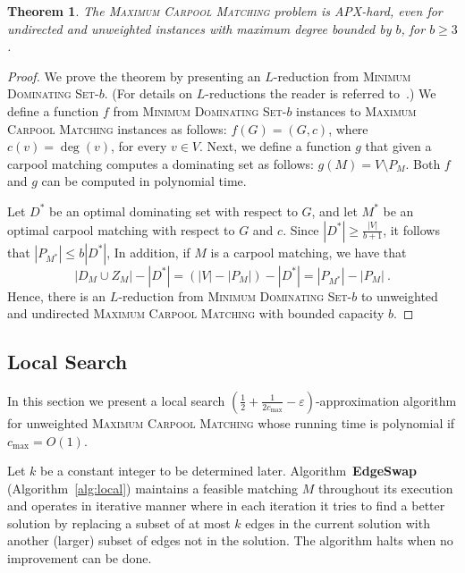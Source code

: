 \documentclass[11pt]{article}
\newtheorem{theorem}{Theorem}
\newcommand{\abs}[1]{\left| #1 \right|}
\newcommand{\half}{\frac{1}{2}}
\newcommand{\inv}[1]{\frac{1}{#1}}
\newcommand{\carpool}{\textsc{Maximum Carpool Matching}\xspace}
\newcommand{\eps}{\varepsilon}
\begin{document}
\begin{theorem}
The \carpool problem is APX-hard, even for undirected and unweighted
instances with maximum degree bounded by $b$, for $b \geq 3$.
\end{theorem}
\begin{proof}
We prove the theorem by presenting an $L$-reduction from
\textsc{Minimum Dominating Set-$b$}.
(For details on $L$-reductions the reader is referred to~\cite{PapYan88}.)
%
We define a function $f$ from \textsc{Minimum Dominating Set-$b$}
instances to \carpool instances as follows: $f(G) = (G,c)$, where
$c(v) = \deg(v)$, for every $v \in V$.  Next, we define a function $g$
that given a carpool matching computes a dominating set as follows:
$g(M) = V \setminus P_{M}$.  Both $f$ and $g$ can be computed in
polynomial time.

Let $D^*$ be an optimal dominating set with respect to $G$, and let
$M^*$ be an optimal carpool matching with respect to $G$ and $c$.
Since $|D^*| \geq \frac{|V|}{b+1}$, it follows that 
\(
\abs{P_{M^*}} \leq b \abs{D^*}
\),
In addition, if $M$ is a carpool matching, we have that
\[
\abs{D_M \cup Z_M} - \abs{D^*}
= (\abs{V} - \abs{P_M}) - \abs{D^*}
= \abs{P_{M^*}} - \abs{P_M}
~.
\]
Hence, there is an $L$-reduction from \textsc{Minimum Dominating
Set-$b$} to unweighted and undirected \carpool with bounded capacity
$b$.
\end{proof}


\subsection{Local Search}
\label{sec:local}

In this section we present a local search $(\half + \inv{2c_{\max}} -
\eps)$-approximation algorithm for unweighted \carpool whose running
time is polynomial if $c_{\max} = O(1)$.

Let $k$ be a constant integer to be determined later.
Algorithm~\textbf{EdgeSwap} (Algorithm~\ref{alg:local}) maintains a
feasible matching $M$ throughout its execution and operates in
iterative manner where in each iteration it tries to find a better
solution by replacing a subset of at most $k$ edges in the current
solution with another (larger) subset of edges not in the solution.
The algorithm halts when no improvement can be done. 
\end{document}
